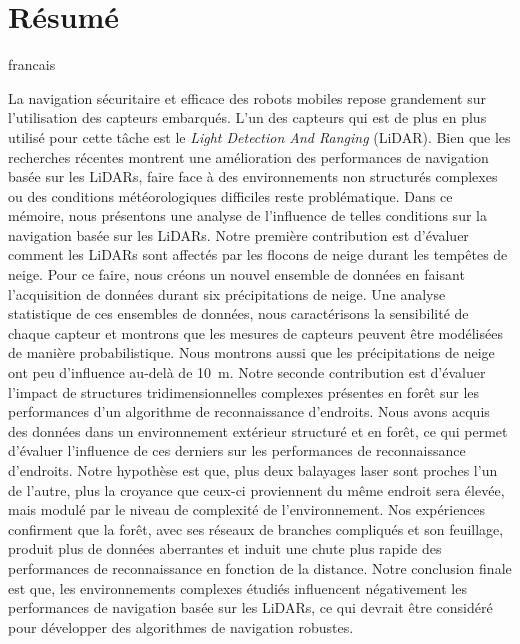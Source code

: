 \chapter*{Résumé}

\begin{otherlanguage*}{francais}

    La navigation sécuritaire et efficace des robots mobiles repose grandement sur l'utilisation des capteurs embarqués. L'un des capteurs qui est de plus en plus utilisé pour cette tâche est le \emph{Light Detection And Ranging} (LiDAR). Bien que les recherches récentes montrent une amélioration des performances de navigation basée sur les LiDARs, faire face à des environnements non structurés complexes ou des conditions météorologiques difficiles reste problématique. Dans ce mémoire, nous présentons une analyse de l'influence de telles conditions sur la navigation basée sur les LiDARs. Notre première contribution est d'évaluer comment les LiDARs sont affectés par les flocons de neige durant les tempêtes de neige. Pour ce faire, nous créons un nouvel ensemble de données en faisant l'acquisition de données durant six précipitations de neige. Une analyse statistique de ces ensembles de données, nous caractérisons la sensibilité de chaque capteur et montrons que les mesures de capteurs peuvent être modélisées de manière probabilistique. Nous montrons aussi que les précipitations de neige ont peu d'influence au-delà de \SI{10}{\meter}. Notre seconde contribution est d'évaluer l'impact de structures tridimensionnelles complexes présentes en forêt sur les performances d'un algorithme de reconnaissance d'endroits. Nous avons acquis des données dans un environnement extérieur structuré et en forêt, ce qui permet d'évaluer l'influence de ces derniers sur les performances de reconnaissance d'endroits. Notre hypothèse est que, plus deux balayages laser sont proches l'un de l'autre, plus la croyance que ceux-ci proviennent du même endroit sera élevée, mais modulé par le niveau de complexité de l'environnement. Nos expériences confirment que la forêt, avec ses réseaux de branches compliqués et son feuillage, produit plus de données aberrantes et induit une chute plus rapide des performances de reconnaissance en fonction de la distance. Notre conclusion finale est que, les environnements complexes étudiés influencent négativement les performances de navigation basée sur les LiDARs, ce qui devrait être considéré pour développer des algorithmes de navigation robustes.


\end{otherlanguage*}

